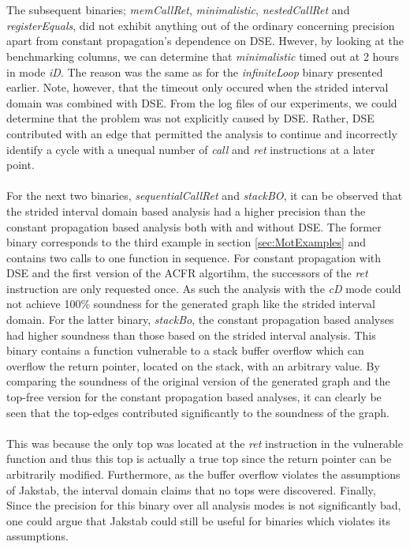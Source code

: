 \documentclass{kththesis}
\renewcommand{\it}[1]{\textit{#1}}
\begin{document}
\\ \\ 
The subsequent binaries; \it{memCallRet}, \it{minimalistic}, \it{nestedCallRet} and \it{registerEquals}, did not exhibit anything out of the ordinary concerning precision apart from constant propagation's dependence on DSE. Hwever, by looking at the benchmarking columns, we can determine that \it{minimalistic} timed out at 2 hours in mode \it{iD}. The reason was the same as for the \it{infiniteLoop} binary presented earlier. Note, however, that the timeout only occured when the strided interval domain was combined with DSE. From the log files of our experiments, we could determine that the problem was not explicitly caused by DSE. Rather, DSE contributed with an edge that permitted the analysis to continue and incorrectly identify a cycle with a unequal number of \it{call} and \it{ret} instructions at a later point. 
\\ \\
For the next two binaries, \it{sequentialCallRet} and \it{stackBO}, it can be observed that the strided interval domain based analysis had a higher precision than the constant propagation based analysis both with and without DSE. The former binary corresponds to the third example in section \ref{sec:MotExamples} and contains two calls to one function in sequence. For constant propagation with DSE and the first version of the ACFR algortihm, the successors of the \it{ret} instruction are only requested once. As such the analysis with the \it{cD} mode could not achieve 100\% soundness for the generated graph like the strided interval domain.
\clearpage
\noindent   
For the latter binary, \it{stackBo}, the constant propagation based analyses had higher soundness than those based on the strided interval analysis. This binary contains a function vulnerable to a stack buffer overflow which can overflow the return pointer, located on the stack, with an arbitrary value. By comparing the soundness of the original version of the generated graph and the top-free version for the constant propagation based analyses, it can clearly be seen that the top-edges contributed significantly to the soundness of the graph. 
\\ \\
This was because the only top was located at the \it{ret} instruction in the vulnerable function and thus this top is actually a true top since the return pointer can be arbitrarily modified. Furthermore, as the buffer overflow violates the assumptions of Jakstab, the interval domain claims that no tops were discovered. Finally, Since the precision for this binary over all analysis modes is not significantly bad, one could argue that Jakstab could still be useful for binaries which violates its assumptions.
\end{document}
